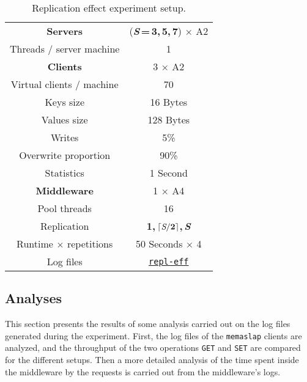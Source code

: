 \documentclass[11pt]{article}
\theoremstyle{definition}
\renewcommand\b[1]{{\bf{#1}}}
\renewcommand\t\texttt
\begin{document}
\begin{table}[!h]
    \centering
    \small
    {
        \smallskip
        \begin{tabular}{|c|c|}
            \hline \b{Servers} & (\b{\textit S\,=\,3,\,5,\,7}) $\times$ A2 \\ 
            {Threads / server machine} & 1 \\ 
            \hline\hline \b{Clients} & 3 $\times$ A2 \\ 
            {Virtual clients / machine} &  70 \\ 
            {Keys size} & 16 Bytes \\
            {Values size} & 128 Bytes \\
            {Writes} & 5\% \\
            {Overwrite proportion} & 90\% \\
            {Statistics} & 1 Second \\
            \hline\hline \b{Middleware} & 1 $\times$ A4 \\ 
            {Pool threads} & 16 \\ 
            {Replication} & \b{1,\,$\lceil\b{\textit S}/\b2\rceil$,\,\textit S} \\ 
            \hline\hline {Runtime $\times$ repetitions} & 50 Seconds $\times$ 4 \\ 
            {Log files} & \hyperref[f:repl]{\t{repl-eff}} \\
            \hline 
        \end{tabular}
    }
    \caption{Replication effect experiment setup.}
    \label{tab:exp4}
\end{table}

\subsection{Analyses}

This section presents the results of some analysis carried out on the log files generated during the experiment.
First, the log files of the \t{memaslap} clients are analyzed, and the throughput of the two operations \t{GET} and \t{SET} are compared for the different setups.
Then a more detailed analysis of the time spent inside the middleware by %
the requests
is carried out from the middleware's logs.

\end{document}
